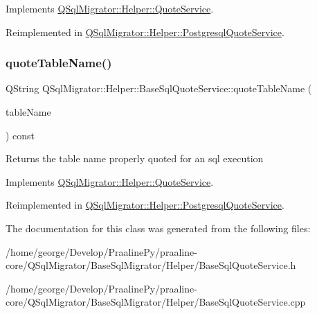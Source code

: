 Implements \hyperlink{class_q_sql_migrator_1_1_helper_1_1_quote_service_a5a557ef5b418afcbe9ae01ce57616218}{Q\+Sql\+Migrator\+::\+Helper\+::\+Quote\+Service}.



Reimplemented in \hyperlink{class_q_sql_migrator_1_1_helper_1_1_postgresql_quote_service_aea4456a2d9ae05fbc1bb653dfcb6571f}{Q\+Sql\+Migrator\+::\+Helper\+::\+Postgresql\+Quote\+Service}.

\mbox{\label{class_q_sql_migrator_1_1_helper_1_1_base_sql_quote_service_aacd2ed13fd6f57bc77b4870ac5105f9e}} 
\subsubsection{\texorpdfstring{quote\+Table\+Name()}{quoteTableName()}}
{\footnotesize\ttfamily Q\+String Q\+Sql\+Migrator\+::\+Helper\+::\+Base\+Sql\+Quote\+Service\+::quote\+Table\+Name (\begin{DoxyParamCaption}\item[{const Q\+String \&}]{table\+Name }\end{DoxyParamCaption}) const\hspace{0.3cm}{\ttfamily [virtual]}}

\begin{DoxyReturn}{Returns}
the table name properly quoted for an sql execution 
\end{DoxyReturn}


Implements \hyperlink{class_q_sql_migrator_1_1_helper_1_1_quote_service_acb56728a4d07a8857955e34536844ec7}{Q\+Sql\+Migrator\+::\+Helper\+::\+Quote\+Service}.



Reimplemented in \hyperlink{class_q_sql_migrator_1_1_helper_1_1_postgresql_quote_service_a56541b2bbc99faae890a9a21d50e14f6}{Q\+Sql\+Migrator\+::\+Helper\+::\+Postgresql\+Quote\+Service}.



The documentation for this class was generated from the following files\+:\begin{DoxyCompactItemize}
\item 
/home/george/\+Develop/\+Praaline\+Py/praaline-\/core/\+Q\+Sql\+Migrator/\+Base\+Sql\+Migrator/\+Helper/Base\+Sql\+Quote\+Service.\+h\item 
/home/george/\+Develop/\+Praaline\+Py/praaline-\/core/\+Q\+Sql\+Migrator/\+Base\+Sql\+Migrator/\+Helper/Base\+Sql\+Quote\+Service.\+cpp\end{DoxyCompactItemize}
